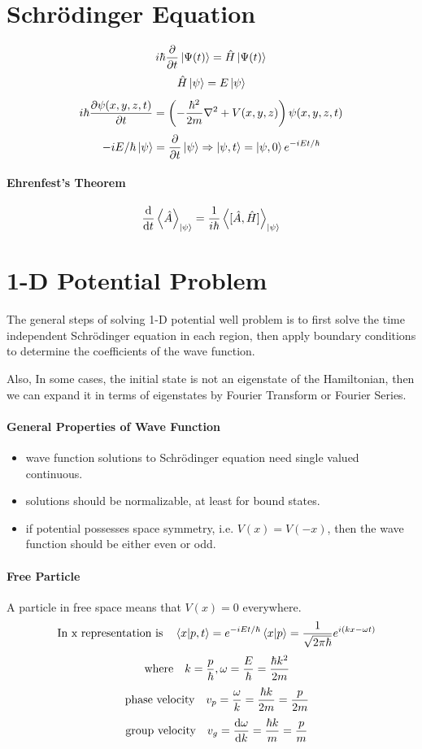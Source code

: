 \documentclass[a4paper,10pt]{article}
\begin{document}
\section{Schrödinger Equation}
$$i\hbar\pdv{t}\ket{\Psi(t)}=\hat{H}\ket{\Psi(t)}$$
$$\hat{H}\ket{\psi}=E\ket{\psi}$$
$$i\hbar\pdv{\psi(x,y,z,t)}{t}=\left(-\frac{\hbar^2}{2m}\laplacian+V(x,y,z)\right)\psi(x,y,z,t)$$
$$-iE/\hbar\ket{\psi}=\pdv{t}\ket{\psi}\Rightarrow\ket{\psi,t}=\ket{\psi,0}e^{-iEt/\hbar}$$
\paragraph{Ehrenfest's Theorem}
$$\dv{t}\expval{\hat{A}}_{\ket{\psi}}=\frac{1}{i\hbar}\expval{[\hat{A},\hat{H}]}_{\ket{\psi}}$$
\section{1-D Potential Problem}
The general steps of solving 1-D potential well problem is to first solve the time independent Schrödinger equation in each region, then apply boundary conditions to determine the coefficients of the wave function.

Also, In some cases, the initial state is not an eigenstate of the Hamiltonian, then we can expand it in terms of eigenstates by Fourier Transform or Fourier Series.
\paragraph{General Properties of Wave Function}
\begin{itemize}
    \item wave function solutions to Schrödinger equation need single valued continuous.
    \item solutions should be normalizable, at least for bound states.
    \item if potential possesses space symmetry, i.e. $V(x)=V(-x)$, then the wave function should be either even or odd.
\end{itemize}
\paragraph{Free Particle}
A particle in free space means that $V(x)=0$ everywhere.
$$\qq{In x representation is}\bra{x}\ket{p,t}=e^{-iEt/\hbar}\bra{x}\ket{p}=\frac{1}{\sqrt{2\pi\hbar}}e^{i(kx-\omega t)}$$
$$\qq{where}k=\frac{p}{\hbar},\omega=\frac{E}{\hbar}=\frac{\hbar k^2}{2m}$$
$$\qq{phase velocity}v_p=\frac{\omega}{k}=\frac{\hbar k}{2m}=\frac{p}{2m}$$
$$\qq{group velocity}v_g=\dv{\omega}{k}=\frac{\hbar k}{m}=\frac{p}{m}$$
\end{document}
